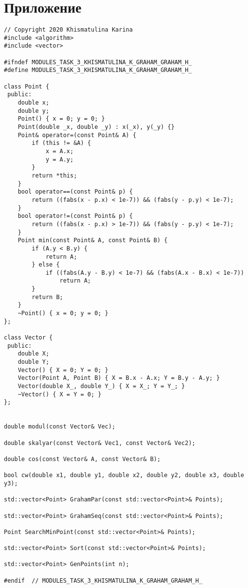 \documentclass{report}
\begin{document}
\section*{Приложение}
\begin{lstlisting}
// Copyright 2020 Khismatulina Karina
#include <algorithm>
#include <vector>

#ifndef MODULES_TASK_3_KHISMATULINA_K_GRAHAM_GRAHAM_H_
#define MODULES_TASK_3_KHISMATULINA_K_GRAHAM_GRAHAM_H_

class Point {
 public:
    double x;
    double y;
    Point() { x = 0; y = 0; }
    Point(double _x, double _y) : x(_x), y(_y) {}
    Point& operator=(const Point& A) {
        if (this != &A) {
            x = A.x;
            y = A.y;
        }
        return *this;
    }
    bool operator==(const Point& p) {
        return ((fabs(x - p.x) < 1e-7)) && (fabs(y - p.y) < 1e-7);
    }
    bool operator!=(const Point& p) {
        return ((fabs(x - p.x) > 1e-7)) && (fabs(y - p.y) < 1e-7);
    }
    Point min(const Point& A, const Point& B) {
        if (A.y < B.y) {
            return A;
        } else {
            if ((fabs(A.y - B.y) < 1e-7) && (fabs(A.x - B.x) < 1e-7))
                return A;
        }
        return B;
    }
    ~Point() { x = 0; y = 0; }
};

class Vector {
 public:
    double X;
    double Y;
    Vector() { X = 0; Y = 0; }
    Vector(Point A, Point B) { X = B.x - A.x; Y = B.y - A.y; }
    Vector(double X_, double Y_) { X = X_; Y = Y_; }
    ~Vector() { X = Y = 0; }
};


double modul(const Vector& Vec);

double skalyar(const Vector& Vec1, const Vector& Vec2);

double cos(const Vector& A, const Vector& B);

bool cw(double x1, double y1, double x2, double y2, double x3, double y3);

std::vector<Point> GrahamPar(const std::vector<Point>& Points);

std::vector<Point> GrahamSeq(const std::vector<Point>& Points);

Point SearchMinPoint(const std::vector<Point>& Points);

std::vector<Point> Sort(const std::vector<Point>& Points);

std::vector<Point> GenPoints(int n);

#endif  // MODULES_TASK_3_KHISMATULINA_K_GRAHAM_GRAHAM_H_

\end{lstlisting}
\end{document}
